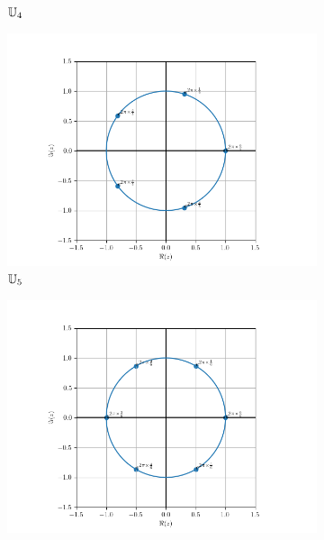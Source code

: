 \begin{figure}
\begin{subfigure}{.3\textwidth}
                          \caption{$\mathbb{U}_4$}
                          \label{fig:U4}      
                        \end{subfigure}
                        \begin{subfigure}{.3\textwidth}
                          \centering
                          \includegraphics[scale = 0.33]{U_5.png}  
                          \caption{$\mathbb{U}_5$}
                          \label{fig:U5}      
                        \end{subfigure}
                        \newline
                        \begin{subfigure}{.3\textwidth}
                          \centering
                          \includegraphics[scale = 0.33]{U_6.png}  

\end{subfigure}
\end{figure}
